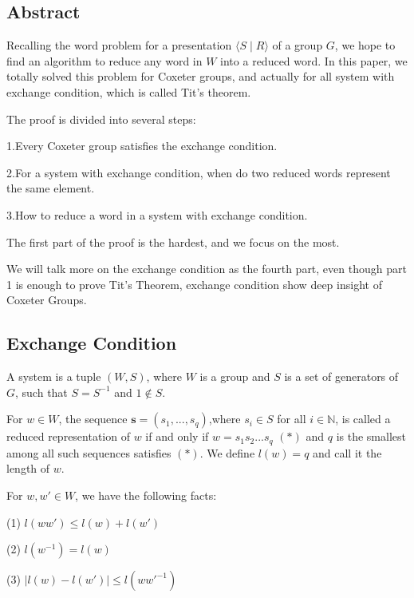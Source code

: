 \subsection{Abstract}

Recalling the word problem for a presentation $\langle S\mid R\rangle$ of a group $G$, we hope to find an algorithm to reduce any word in $W$ into a reduced word. In this paper, we totally solved this problem for Coxeter groups, and actually for all system with exchange condition, which is called Tit's theorem.

\noindent The proof is divided into several steps:

1.Every Coxeter group satisfies the exchange condition.

2.For a system with exchange condition, when do two reduced words represent the same element.

3.How to reduce a word in a system with exchange condition.

The first part of the proof is the hardest, and we focus on the most.

We will talk more on the exchange condition as the fourth part, even though part 1 is enough to prove Tit's Theorem, exchange condition show deep insight of Coxeter Groups.

\subsection{Exchange Condition}
\begin{definition}
    A system is a tuple $(W,S)$, where $W$ is a group and $S$ is a set of generators of $G$, such that $S=S^{-1}$ and $1\notin S$.
\end{definition} 


\begin{definition}
    For $w \in W$, the sequence $\mathbf{s}=(s_1,...,s_q)$,where $s_i \in S$ for all $i\in \mathbb{N}$, is called a reduced representation of $w$ if and only if $w=s_1s_2...s_q$ $(*)$ and $q$ is the smallest among all such sequences satisfies $(*)$. We define $l(w)=q$ and call it the length of $w$.
\end{definition} 


\begin{proposition}\label{prop:length}
    For $w,w'\in W$, we have the following facts:

\indent (1) $l(ww')\le l(w)+l(w')$

\indent (2) $l(w^{-1}) = l(w)$

\indent (3) $|l(w)-l(w')| \le l(ww'^{-1})$
\end{proposition} 

